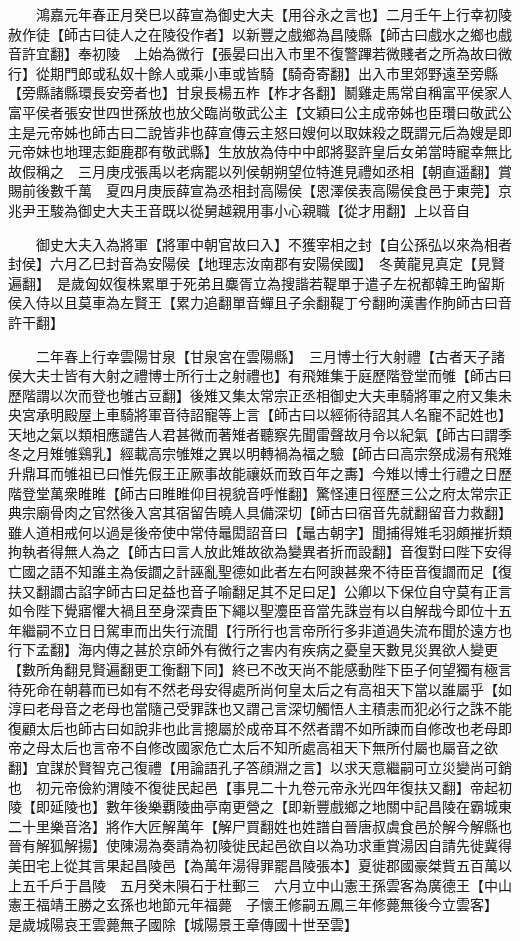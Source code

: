 　　鴻嘉元年春正月癸巳以薛宣為御史大夫【用谷永之言也】二月壬午上行幸初陵赦作徒【師古曰徒人之在陵役作者】以新豐之戲鄉為昌陵縣【師古曰戲水之鄉也戲音許宜翻】奉初陵　上始為微行【張晏曰出入市里不復警蹕若微賤者之所為故曰微行】從期門郎或私奴十餘人或乘小車或皆騎【騎奇寄翻】出入市里郊野遠至旁縣【旁縣諸縣環長安旁者也】甘泉長楊五柞【柞才各翻】鬭雞走馬常自稱富平侯家人富平侯者張安世四世孫放也放父臨尚敬武公主【文穎曰公主成帝姊也臣瓚曰敬武公主是元帝姊也師古曰二說皆非也薛宣傳云主怒曰嫂何以取妺殺之既謂元后為嫂是即元帝妹也地理志鉅鹿郡有敬武縣】生放放為侍中中郎將娶許皇后女弟當時寵幸無比故假稱之　三月庚戌張禹以老病罷以列侯朝朔望位特進見禮如丞相【朝直遥翻】賞賜前後數千萬　夏四月庚辰薛宣為丞相封高陽侯【恩澤侯表高陽侯食邑于東莞】京兆尹王駿為御史大夫王音既以從舅越親用事小心親職【從才用翻】上以音自

　　御史大夫入為將軍【將軍中朝官故曰入】不獲宰相之封【自公孫弘以來為相者封侯】六月乙巳封音為安陽侯【地理志汝南郡有安陽侯國】　冬黄龍見真定【見賢遍翻】　是歲匈奴復株累單于死弟且麋胥立為搜諧若鞮單于遣子左祝都韓王昫留斯侯入侍以且莫車為左賢王【累力追翻單音蟬且子余翻鞮丁兮翻昫漢書作胊師古曰音許干翻】

　　二年春上行幸雲陽甘泉【甘泉宮在雲陽縣】　三月博士行大射禮【古者天子諸侯大夫士皆有大射之禮博士所行士之射禮也】有飛雉集于庭歷階登堂而雊【師古曰歷階謂以次而登也雊古豆翻】後雉又集太常宗正丞相御史大夫車騎將軍之府又集未央宮承明殿屋上車騎將軍音待詔寵等上言【師古曰以經術待詔其人名寵不記姓也】天地之氣以類相應譴告人君甚微而著雉者聽察先聞雷聲故月令以紀氣【師古曰謂季冬之月雉雊鷄乳】經載高宗雊雉之異以明轉禍為福之驗【師古曰高宗祭成湯有飛雉升鼎耳而雊祖已曰惟先假王正厥事故能禳妖而致百年之夀】今雉以博士行禮之日歷階登堂萬衆睢睢【師古曰睢睢仰目視貌音呼惟翻】驚怪連日徑歷三公之府太常宗正典宗廟骨肉之官然後入宮其宿留告曉人具備深切【師古曰宿音先就翻留音力救翻】雖人道相戒何以過是後帝使中常侍鼂閎詔音曰【鼂古朝字】聞捕得雉毛羽頗摧折類拘執者得無人為之【師古曰言人放此雉故欲為變異者折而設翻】音復對曰陛下安得亡國之語不知誰主為佞讇之計誣亂聖德如此者左右阿諛甚衆不待臣音復讇而足【復扶又翻讇古諂字師古曰足益也音子喻翻足其不足曰足】公卿以下保位自守莫有正言如令陛下覺寤懼大禍且至身深責臣下繩以聖灋臣音當先誅豈有以自解哉今即位十五年繼嗣不立日日駕車而出失行流聞【行所行也言帝所行多非道過失流布聞於遠方也行下孟翻】海内傳之甚於京師外有微行之害内有疾病之憂皇天數見災異欲人變更【數所角翻見賢遍翻更工衡翻下同】終已不改天尚不能感動陛下臣子何望獨有極言待死命在朝暮而已如有不然老母安得處所尚何皇太后之有高祖天下當以誰屬乎【如淳曰老母音之老母也當隨己受罪誅也又謂己言深切觸悟人主積恚而犯必行之誅不能復顧太后也師古曰如說非也此言摠屬於成帝耳不然者謂不如所諫而自修改也老母即帝之母太后也言帝不自修改國家危亡太后不知所處高祖天下無所付屬也屬音之欲翻】宜謀於賢智克己復禮【用論語孔子答顔淵之言】以求天意繼嗣可立災變尚可銷也　初元帝儉約渭陵不復徙民起邑【事見二十九卷元帝永光四年復扶又翻】帝起初陵【即延陵也】數年後樂覇陵曲亭南更營之【即新豐戲鄉之地關中記昌陵在霸城東二十里樂音洛】將作大匠解萬年【解尸買翻姓也姓譜自晉唐叔虞食邑於解今解縣也晉有解狐解揚】使陳湯為奏請為初陵徙民起邑欲自以為功求重賞湯因自請先徙冀得美田宅上從其言果起昌陵邑【為萬年湯得罪罷昌陵張本】夏徙郡國豪桀貲五百萬以上五千戶于昌陵　五月癸未隕石于杜郵三　六月立中山憲王孫雲客為廣德王【中山憲王福靖王勝之玄孫也地節元年福薨　子懷王修嗣五鳳三年修薨無後今立雲客】　是歲城陽哀王雲薨無子國除【城陽景王章傳國十世至雲】

